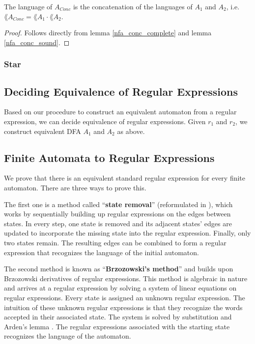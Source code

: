 \begin{corollary}
    The language of $A_{Conc}$ is the concatenation of the languages of $A_1$ and $A_2$, i.e. $\lang{A_{Conc}} = \lang{A_1} \cdot \lang{A_2}$.
\end{corollary}
\begin{proof}
    Follows directly from lemma \ref{nfa_conc_complete} and lemma \ref{nfa_conc_sound}. 
\end{proof}



\subsubsection{Star}






\subsection{Deciding Equivalence of Regular Expressions}

 
Based on our procedure to construct an equivalent automaton from a regular expression, we can decide equivalence of regular expressions. Given $r_1$ and $r_2$, we construct equivalent DFA $A_1$ and $A_2$ as above.


\subsection{Finite Automata to Regular Expressions}
We prove that there is an equivalent standard regular expression for every finite automaton.
There are three ways to prove this. 


The first one is a method called ``\textbf{state removal}'' \cite{SignalFlow} (reformulated in \cite{springerlink:10.1007/978-3-540-30500-2}),
which works by sequentially building up regular expressions on the edges between states. 
In every step, one state is removed and its adjacent states' edges are updated to incorporate the missing state into the regular expression.
Finally, only two states remain. The resulting edges can be combined to form a regular expression that recognizes the language of the initial automaton.


The second method is known as ``\textbf{Brzozowski's method}'' \cite{DBLP:journals/jacm/Brzozowski64} and builds upon Brzozowski derivatives of regular expressions.
This method is algebraic in nature and arrives at a regular expression by solving a system of linear equations on regular expressions. 
Every state is assigned an unknown regular expression. 
The intuition of these unknown regular expressions is that they recognize the words accepted in their associated state. 
The system is solved by substitution and Arden's lemma \cite{DBLP:conf/focs/Arden61}.
The regular expressions associated with the starting state recognizes the language of the automaton.


